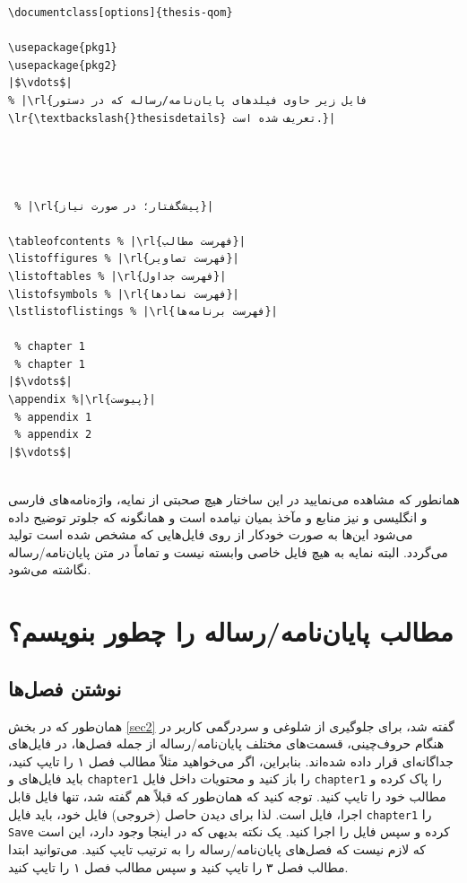 \begin{latin}    
\begin{lstlisting}[title=\rl{ساختار کلی سند اصلی}, escapechar={|},]
\documentclass[options]{thesis-qom}
    
\usepackage{pkg1}
\usepackage{pkg2}
|$\vdots$|
% |\rl{فایل زیر حاوی فیلدهای پایان‌نامه/رساله که در دستور \lr{\textbackslash{}thesisdetails} تعریف شده است.}|    
 



 % |\rl{پیشگفتار؛ در صورت نیاز}|

\tableofcontents % |\rl{فهرست مطالب}|
\listoffigures % |\rl{فهرست تصاویر}|
\listoftables % |\rl{فهرست جداول}|
\listofsymbols % |\rl{فهرست نمادها}|
\lstlistoflistings % |\rl{فهرست برنامه‌ها}|
        
 % chapter 1
 % chapter 1
|$\vdots$|        
\appendix %|\rl{پیوست‌}|
 % appendix 1
 % appendix 2
|$\vdots$|
 
\end{lstlisting}
\end{latin}
    همانطور که مشاهده می‌نمایید در این ساختار هیچ صحبتی از نمایه،‌ واژه‌نامه‌های فارسی و انگلیسی و نیز منابع و مآخذ بمیان نیامده است و 
    همانگونه که جلوتر توضیح داده می‌شود این‌ها به صورت خودکار از روی فایل‌هایی که مشخص شده است تولید می‌گردد. البته نمایه به هیچ 
    فایل خاصی وابسته نیست و تماماً در متن پایان‌نامه/رساله نگاشته می‌شود.
        
    \section{مطالب پایان‌نامه/رساله را چطور بنویسم؟}
    \subsection{نوشتن فصل‌ها}
    همان‌طور که در بخش \ref{sec2} گفته شد، برای جلوگیری از شلوغی و سردرگمی کاربر در هنگام حروف‌چینی، قسمت‌های مختلف پایان‌نامه/رساله 
    از جمله فصل‌ها، در فایل‌های جداگانه‌ای قرار داده شده‌اند. 
    بنابراین، اگر می‌خواهید مثلاً مطالب فصل ۱ را تایپ کنید، باید فایل‌های 
    و
    \Verb!chapter1!
    را باز کنید و محتویات داخل فایل 
    \Verb!chapter1!
    را پاک کرده و مطالب خود را تایپ کنید. توجه کنید که همان‌طور که قبلاً هم گفته شد، تنها فایل قابل اجرا، فایل 
    است. لذا برای دیدن حاصل (خروجی) فایل خود، باید فایل  
    \Verb!chapter1!
    را 
    \Verb!Save!
    کرده و سپس فایل 
    را اجرا کنید. یک نکته بدیهی که در اینجا وجود دارد، این است که لازم نیست که فصل‌های پایان‌نامه/رساله را به ترتیب تایپ کنید. می‌توانید ابتدا 
    مطالب فصل ۳ را تایپ کنید و سپس مطالب فصل ۱ را تایپ کنید. 

